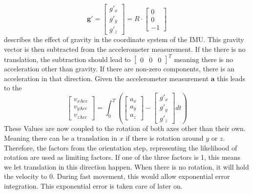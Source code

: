 \documentclass[letterpaper, 10 pt, conference]{ieeeconf}  %
\newcommand{\V}[1]{\mathbf{#1}} %
\begin{document}
\begin{equation}
\V g\V '=\begin{bmatrix}
g'_x\\
g'_y\\
g'_z
\end{bmatrix}
= R \cdot \begin{bmatrix}
0 \\0  \\ - 1
\end{bmatrix}
\end{equation}
describes the effect of gravity in the coordinate system of the IMU.
This gravity vector is then subtracted from the accelerometer measurement. If the there is no translation, the subtraction should lead to $\begin{bmatrix}
0 & 0&0
\end{bmatrix}^T$ meaning there is no acceleration other than gravity. If there are non-zero components, there is an acceleration in that direction. Given the accelerometer measurement $\V a$ this leads to the 
\begin{equation}
\begin{bmatrix}
v_{x\text{Acc}} \\ v_{y\text{Acc}} \\v_{z\text{Acc}} 
\end{bmatrix}
= 
\int_0^T \left(\begin{bmatrix}
a_x \\ a_y \\ a_z
\end{bmatrix} 
-  \begin{bmatrix}
g'_x\\
g'_y\\
g'_z
\end{bmatrix} dt\right)
\end{equation}
These Values are now coupled to the rotation of both axes other than their own. Meaning there can be a translation in $x$ if there is rotation around $y$ or $z$.
Therefore, the factors from the orientation step, representing the likelihood of rotation are used as limiting factors.
If one of the three factors is 1, this means we let translation in this direction happen.
When there is no rotation, it will hold the velocity to 0.
During fast movement, this would allow exponential error integration. 
This exponential error is taken care of later on.
\end{document}
